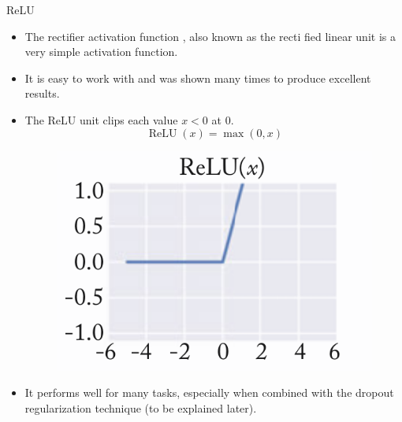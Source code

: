 \documentclass[handout]{beamer}
\begin{document}
\begin{frame}{ReLU}
\begin{scriptsize}
\begin{itemize}
\item The rectifier activation function \cite{glorot2011deep}, also known as the recti fied linear unit is a very simple activation function.
\item It is easy to work with and was shown many times to produce excellent results.
\item The ReLU unit clips each value $x < 0$ at $0$.
\begin{displaymath}
 \operatorname{ReLU}(x) = \operatorname{max}(0,x)
\end{displaymath}
\begin{figure}[htb]
	\centering
	 \includegraphics[scale=0.3]{pics/relu.png}
\end{figure}
\item It performs well for many tasks, especially when combined with the dropout regularization technique (to be explained later).
\end{itemize}
\end{scriptsize}
\end{frame}
\end{document}
